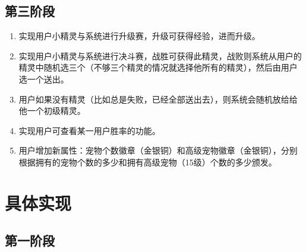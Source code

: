 \documentclass{ctexart}
\begin{document}
\subsection{第三阶段}
\begin{enumerate}
  \item 实现用户小精灵与系统进行升级赛，升级可获得经验，进而升级。
  \item 实现用户小精灵与系统进行决斗赛，战胜可获得此精灵，战败则系统从用户的精灵中随机选三个（不够三个精灵的情况就选择他所有的精灵），然后由用户选一个送出。
  \item 用户如果没有精灵（比如总是失败，已经全部送出去），则系统会随机放给给他一个初级精灵。
  \item 实现用户可查看某一用户胜率的功能。
  \item 用户增加新属性：宠物个数徽章（金银铜）和高级宠物徽章（金银铜），分别根据拥有的宠物个数的多少和拥有高级宠物（15级）个数的多少颁发。
\end{enumerate}

\section{具体实现}
\label{sec:realization}
\subsection{第一阶段}
\end{document}
